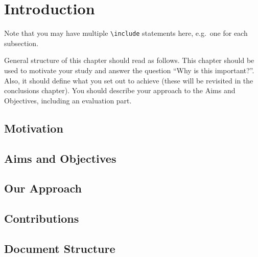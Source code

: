 \chapter{Introduction}

Note that you may have multiple \texttt{{\textbackslash}include} statements here, e.g.\ one for each subsection.

General structure of this chapter should read as follows.  This chapter should be used to motivate your study and answer the question ``Why is this important?''. Also, it should define what you set out to achieve (these will be revisited in the conclusions chapter). You should describe your approach to the Aims and Objectives, including an evaluation part.  %

\section{Motivation} %
\blindtext

\section{Aims and Objectives} 
\blindtext

\section{Our Approach} 
\blindtext

\section{Contributions} 
\blindtext

\section{Document Structure}
\blindtext
